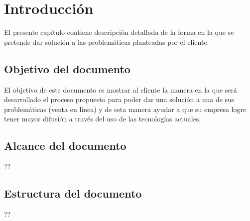 
\chapter{Introducción}

	El presente capítulo contiene descripción detallada de la forma en la que se pretende dar solución a las problemáticas planteadas por el cliente. 

	\section{Objetivo del documento}
		
		El objetivo de este documento es mostrar al cliente la manera en la que será desarrollado el proceso propuesto para poder dar una solución a una de sus problemáticas (venta en línea) y de esta manera ayudar a que su empresa logre tener mayor difusión a través del uso de las tecnologías actuales.

	\section{Alcance del documento}

		??
	\section{Estructura del documento}
		??
